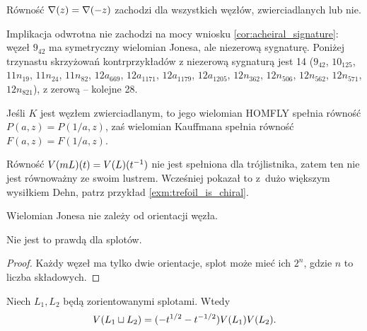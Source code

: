 Równość $\nabla(z) = \nabla(-z)$ zachodzi dla wszystkich węzłów, zwierciadlanych lub nie.

Implikacja odwrotna nie zachodzi na mocy wniosku \ref{cor:acheiral_signature}: węzeł $9_{42}$ ma symetryczny wielomian Jonesa, ale niezerową sygnaturę.
%
Poniżej trzynastu skrzyżowań kontrprzykładów z niezerową sygnaturą jest 14 ($9_{42}$, $10_{125}$, $11n_{19}$, $11n_{24}$, $11n_{82}$, $12a_{669}$, $12a_{1171}$, $12a_{1179}$, $12a_{1205}$, $12n_{362}$, $12n_{506}$, $12n_{562}$, $12n_{571}$, $12n_{821}$), z zerową -- kolejne 28.

\begin{corollary}
%
    Jeśli $K$ jest węzłem zwierciadlanym, to jego wielomian HOMFLY spełnia równość $P(a, z) = P(1/a, z)$, zaś wielomian Kauffmana spełnia równość $F(a, z) = F(1/a, z)$.
\end{corollary}

Równość $V(mL)(t) = V(L)(t^{-1})$ nie jest spełniona dla trójlistnika, zatem ten nie jest równoważny ze swoim lustrem.
Wcześniej pokazał to z~dużo większym wysiłkiem Dehn, patrz przykład \ref{exm:trefoil_is_chiral}.
%

\begin{corollary}
    Wielomian Jonesa nie zależy od orientacji węzła.
\end{corollary}

Nie jest to prawdą dla splotów.

\begin{proof}
    Każdy węzeł ma tylko dwie orientacje, splot może mieć ich $2^n$, gdzie $n$ to liczba składowych.
\end{proof}

\begin{proposition}
%
\label{prp:jones_multiplicative_1}%
    Niech $L_1, L_2$ będą zorientowanymi splotami.
    Wtedy
    \begin{equation}
        V(L_1 \sqcup L_2) = (-t^{1/2} - t^{-1/2}) V(L_1) V(L_2).
    \end{equation}
\end{proposition}

